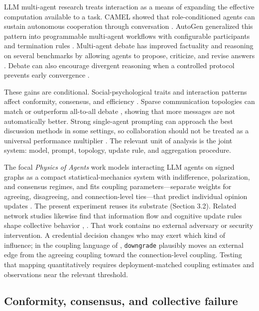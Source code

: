 \documentclass[11pt]{article}
\begin{document}
LLM multi-agent research treats interaction as a means of expanding the effective computation available to a task. CAMEL showed that role-conditioned agents can sustain autonomous cooperation through conversation \cite{li2023camel}. AutoGen generalized this pattern into programmable multi-agent workflows with configurable participants and termination rules \cite{wu2024autogen}. Multi-agent debate has improved factuality and reasoning on several benchmarks by allowing agents to propose, criticize, and revise answers \cite{du2024debate}. Debate can also encourage divergent reasoning when a controlled protocol prevents early convergence \cite{liang2024divergent}.

These gains are conditional. Social-psychological traits and interaction patterns affect conformity, consensus, and efficiency \cite{zhang2024social}. Sparse communication topologies can match or outperform all-to-all debate \cite{li2024sparse}, showing that more messages are not automatically better. Strong single-agent prompting can approach the best discussion methods in some settings, so collaboration should not be treated as a universal performance multiplier \cite{wang2024bounds}. The relevant unit of analysis is the joint system: model, prompt, topology, update rule, and aggregation procedure.

The focal \textit{Physics of Agents} work models interacting LLM agents on signed graphs as a compact statistical-mechanics system with indifference, polarization, and consensus regimes, and fits coupling parameters—separate weights for agreeing, disagreeing, and connection-level ties—that predict individual opinion updates \cite{el2026physics}. The present experiment reuses its substrate (Section 3.2). Related network studies likewise find that information flow and cognitive update rules shape collective behavior \cite{chuang2024opinion}, \cite{zomer2026collective}. That work contains no external adversary or security intervention. A credential decision changes who may exert which kind of influence; in the coupling language of \cite{el2026physics}, \texttt{downgrade} plausibly moves an external edge from the agreeing coupling toward the connection-level coupling. Testing that mapping quantitatively requires deployment-matched coupling estimates and observations near the relevant threshold.

\subsection{Conformity, consensus, and collective failure}
\end{document}
